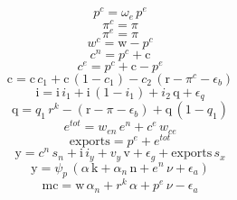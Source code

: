 \begin{dmath}
{{p^{c}}}={{\omega_{e}}}\, {{p^{e}}}
\end{dmath}
\begin{dmath}
{{\pi^{c}}}={{\pi}}
\end{dmath}
\begin{dmath}
{{\pi^{e}}}={{\pi}}
\end{dmath}
\begin{dmath}
{{w^{c}}}={{\mathrm{w}}}-{{p^{c}}}
\end{dmath}
\begin{dmath}
{{c^{n}}}={{p^{c}}}+{{\mathrm{c}}}
\end{dmath}
\begin{dmath}
{{c^{e}}}={{p^{c}}}+{{\mathrm{c}}}-{{p^{e}}}
\end{dmath}
\begin{dmath}
{{\mathrm{c}}}={{\mathrm{c}}}\, {{c_{1}}}+{{\mathrm{c}}}\, \left(1-{{c_{1}}}\right)-{{c_{2}}}\, \left({{\mathrm{r}}}-{{\pi^{c}}}-{{\epsilon_{b}}}\right)
\end{dmath}
\begin{dmath}
{{\mathrm{i}}}={{\mathrm{i}}}\, {{i_{1}}}+{{\mathrm{i}}}\, \left(1-{{i_{1}}}\right)+{{i_{2}}}\, {{\mathrm{q}}}+{{\epsilon_{q}}}
\end{dmath}
\begin{dmath}
{{\mathrm{q}}}={{q_{1}}}\, {{r^{k}}}-\left({{\mathrm{r}}}-{{\pi}}-{{\epsilon_{b}}}\right)+{{\mathrm{q}}}\, \left(1-{{q_{1}}}\right)
\end{dmath}
\begin{dmath}
{{e^{tot}}}={{w_{en}}}\, {{e^{n}}}+{{c^{e}}}\, {{w_{ce}}}
\end{dmath}
\begin{dmath}
{{\mathrm{exports}}}={{p^{e}}}+{{e^{tot}}}
\end{dmath}
\begin{dmath}
{{\mathrm{y}}}={{c^{n}}}\, {{s_{n}}}+{{\mathrm{i}}}\, {{i_{y}}}+{{v_{y}}}\, {{\mathrm{v}}}+{{\epsilon_{g}}}+{{\mathrm{exports}}}\, {{s_{x}}}
\end{dmath}
\begin{dmath}
{{\mathrm{y}}}={{\psi_{p}}}\, \left({{\alpha}}\, {{\mathrm{k}}}+{{\alpha_{n}}}\, {{\mathrm{n}}}+{{e^{n}}}\, {{\nu}}+{{\epsilon_{a}}}\right)
\end{dmath}
\begin{dmath}
{{\mathrm{mc}}}={{\mathrm{w}}}\, {{\alpha_{n}}}+{{r^{k}}}\, {{\alpha}}+{{p^{e}}}\, {{\nu}}-{{\epsilon_{a}}}
\end{dmath}
